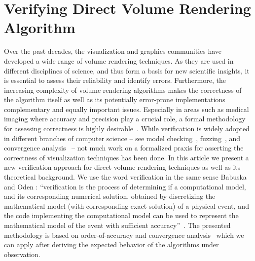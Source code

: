 \chapter{Verifying Direct Volume Rendering Algorithm}
\label{chap:vr}

Over the past decades, the visualization and graphics communities have developed a wide range of volume rendering techniques. As they are used in different disciplines of science, and thus form a basis for new scientific insights, it is essential to assess their reliability and identify errors. Furthermore, the increasing complexity of volume rendering algorithms makes the correctness of the algorithm itself as well as its potentially error-prone implementations complementary and equally important issues. Especially in areas such as medical imaging where accuracy and precision play a crucial role, a formal methodology for assessing correctness is highly desirable~\cite{kirby-vv-08, Pommert2002}. While verification is widely adopted in different branches of computer science -- see  model checking~\cite{Clarke08}, fuzzing~\cite{godefroid08}, and convergence analysis~\cite{Roy2005} -- not much work on a formalized praxis for asserting the correctness of visualization techniques has been done. 
In this article we present a new verification approach for direct volume rendering techniques as well as its theoretical background. 
We use the word verification in the same sense Babuska and Oden \cite{babuska04}: ``verification is the process of determining if a computational model, and its corresponding numerical solution, obtained by discretizing the mathematical model (with corresponding exact solution) of a physical event, and the code implementing the computational model can be used to represent the mathematical model of the event with sufficient accuracy''~\cite{babuska04}. 
The presented methodology is based on order-of-accuracy and convergence analysis~\cite{Roy2005} which we can apply after deriving the expected behavior of the algorithms under observation. 

